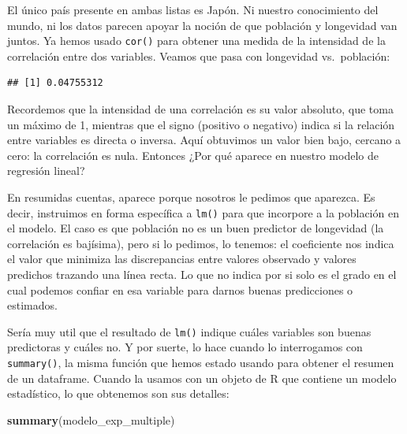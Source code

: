 \documentclass[spanish,]{book}
\newenvironment{Shaded}{\begin{snugshade}}{\end{snugshade}}
\newcommand{\DecValTok}[1]{\textcolor[rgb]{0.00,0.00,0.81}{#1}}
\newcommand{\KeywordTok}[1]{\textcolor[rgb]{0.13,0.29,0.53}{\textbf{#1}}}
\newcommand{\NormalTok}[1]{#1}
\newcommand{\OperatorTok}[1]{\textcolor[rgb]{0.81,0.36,0.00}{\textbf{#1}}}
\begin{document}
El único país presente en ambas listas es Japón. Ni nuestro conocimiento del mundo, ni los datos parecen apoyar la noción de que población y longevidad van juntos. Ya hemos usado \texttt{cor()} para obtener una medida de la intensidad de la correlación entre dos variables. Veamos que pasa con longevidad vs.~población:

\begin{Shaded}
\end{Shaded}

\begin{verbatim}
## [1] 0.04755312
\end{verbatim}

Recordemos que la intensidad de una correlación es su valor absoluto, que toma un máximo de 1, mientras que el signo (positivo o negativo) indica si la relación entre variables es directa o inversa. Aquí obtuvimos un valor bien bajo, cercano a cero: la correlación es nula. Entonces ¿Por qué aparece en nuestro modelo de regresión lineal?

En resumidas cuentas, aparece porque nosotros le pedimos que aparezca. Es decir, instruimos en forma específica a \texttt{lm()} para que incorpore a la población en el modelo. El caso es que población no es un buen predictor de longevidad (la correlación es bajísima), pero si lo pedimos, lo tenemos: el coeficiente nos indica el valor que minimiza las discrepancias entre valores observado y valores predichos trazando una línea recta. Lo que no indica por si solo es el grado en el cual podemos confiar en esa variable para darnos buenas predicciones o estimados.

Sería muy util que el resultado de \texttt{lm()} indique cuáles variables son buenas predictoras y cuáles no. Y por suerte, lo hace cuando lo interrogamos con \texttt{summary()}, la misma función que hemos estado usando para obtener el resumen de un dataframe. Cuando la usamos con un objeto de R que contiene un modelo estadístico, lo que obtenemos son sus detalles:

\begin{Shaded}
\begin{Highlighting}[]
\KeywordTok{summary}\NormalTok{(modelo_exp_multiple)}
\end{Highlighting}
\end{Shaded}
\end{document}
